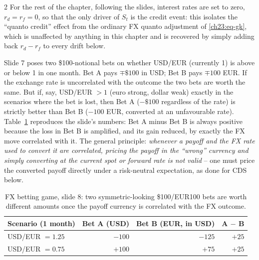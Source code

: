 \begin{paracol}{2}
For the rest of the chapter, following the slides, interest rates are set to zero, $r_d=r_f=0$, so that the only
driver of $S_t$ is the credit event: this isolates the ``quanto credit'' effect from the ordinary FX quanto
adjustment of \cref{ch23:eq-gk}, which is unaffected by anything in this chapter and is recovered by simply adding
back $r_d-r_f$ to every drift below.

\begin{finance}
Slide 7 poses two \$100-notional bets on whether USD/EUR (currently 1) is above or below 1 in one month. Bet A
pays $\mp\$100$ in USD; Bet B pays $\mp100$ EUR. If the exchange rate is uncorrelated with the outcome the two
bets are worth the same. But if, say, USD/EUR $>1$ (euro strong, dollar weak) exactly in the scenarios where the
bet is lost, then Bet A ($-\$100$ regardless of the rate) is strictly better than Bet B ($-100$ EUR, converted at
an unfavourable rate). Table~\ref{ch23:tab-game} reproduces the slide's numbers: Bet A minus Bet B is always
positive because the loss in Bet B is amplified, and its gain reduced, by exactly the FX move correlated with it. The general
principle: \emph{whenever a payoff and the FX rate used to convert it are correlated, pricing the payoff in the
``wrong'' currency and simply converting at the current spot or forward rate is not valid} -- one must price the
converted payoff directly under a risk-neutral expectation, as done for CDS below.
\end{finance}

\begin{table}[htbp]
\centering
\caption{FX betting game, slide 8: two symmetric-looking \$100/EUR100 bets are worth different amounts once
the payoff currency is correlated with the FX outcome.}\label{ch23:tab-game}
\begin{tabular}{@{}lrrr@{}}
\toprule
Scenario (1 month) & Bet A (USD) & Bet B (EUR, in USD) & A $-$ B\\
\midrule
USD/EUR $=1.25$ & $-100$ & $-125$ & $+25$\\
USD/EUR $=0.75$ & $+100$ & $+75$ & $+25$\\
\bottomrule
\end{tabular}
\end{table}


\end{paracol}
